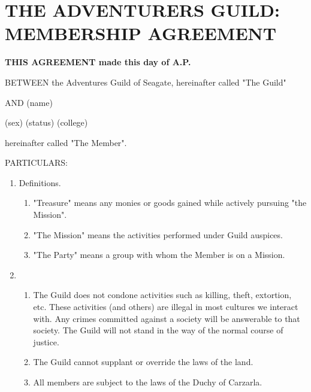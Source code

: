 \section{THE ADVENTURERS GUILD: MEMBERSHIP AGREEMENT}

\bigskip

{\fontsize{8}{9pt}\selectfont

{\bfseries
THIS AGREEMENT made this \hspace{15em} day of \hspace{16em} A.P.

BETWEEN the Adventures Guild of Seagate, hereinafter called "The Guild"

\vspace{5mm}

\hspace{5mm}   AND  \hspace{5mm}        (name)

\vspace{5mm}

\hspace{5mm}     (sex)
\hspace{5mm}     (status)  \hspace{5mm}   (college)

\vspace{5mm}

\hspace{5mm}   hereinafter called "The Member".

\vspace{5mm}


PARTICULARS:}

\begin{enumerate}

\item    Definitions.
\begin{enumerate}
\item "Treasure" means any monies or goods gained while actively pursuing "the Mission".
\item "The Mission" means the activities performed under Guild auspices.
\item "The Party" means a group with whom the Member is on a Mission.
\end{enumerate}

\item \begin{enumerate}
\item  The Guild does not condone activities such as killing, theft,
extortion, etc. These activities (and others) are illegal in most
cultures we interact with. Any crimes committed against a society will
be answerable to that society. The Guild will not stand in the way of
the normal course of justice.
\item The Guild cannot supplant or override the laws of the land.
\item  All members are subject to the laws of the Duchy of Carzarla.
\end{enumerate}


\end{enumerate}}
